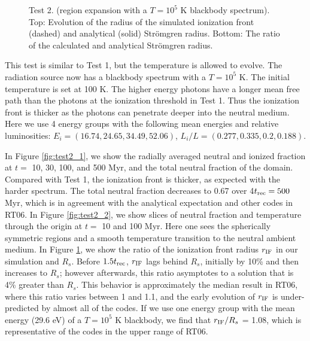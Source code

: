 \documentclass[useAMS,usenatbib]{mn2e}
\begin{document}
\begin{figure*}
  \caption{\label{fig:test2_2} Test 2. (\hii region expansion
    with a $T=10^5$ K blackbody spectrum).  Top: Slices through the
    origin of neutral fraction at 10 and 100 Myr.  Bottom: Slices of
    temperature at 10 and 100 Myr.}
\end{figure*}

\begin{figure}
  \caption{\label{fig:test2_3} Test 2. (\hii region expansion
    with a $T=10^5$ K blackbody spectrum).  Top: Evolution of the
    radius of the simulated ionization front (dashed) and analytical
    (solid) Str\"{o}mgren radius.  Bottom: The ratio of the calculated
    and analytical Str\"{o}mgren radius.}
\end{figure}

This test is similar to Test 1, but the temperature is allowed to
evolve.  The radiation source now has a blackbody spectrum with a $T =
10^5$ K.  The initial temperature is set at 100 K.  The higher energy
photons have a longer mean free path than the photons at the
ionization threshold in Test 1.  Thus the ionization front is thicker
as the photons can penetrate deeper into the neutral medium.  Here we
use 4 energy groups with the following mean energies and relative
luminosities: $E_i = (16.74, 24.65, 34.49, 52.06)$, $L_i/L = (0.277,
0.335, 0.2, 0.188)$.

In Figure \ref{fig:test2_1}, we show the radially averaged neutral and
ionized fraction at $t = $ 10, 30, 100, and 500 Myr, and the total
neutral fraction of the domain.  Compared with Test 1, the ionization
front is thicker, as expected with the harder spectrum.  The total
neutral fraction decreases to 0.67 over 4$t_{\rm rec} = 500$ Myr,
which is in agreement with the analytical expectation and other codes
in RT06.  In Figure \ref{fig:test2_2}, we show slices of neutral
fraction and temperature through the origin at $t = $ 10 and 100 Myr.
Here one sees the spherically symmetric \hii regions and a smooth
temperature transition to the neutral ambient medium.  In Figure
\ref{fig:test2_3}, we show the ratio of the ionization front radius
$r_{\rm IF}$ in our simulation and $R_s$.  Before $1.5t_{\rm rec}$,
$r_{\rm IF}$ lags behind $R_s$, initially by 10\% and then increases
to $R_s$; however afterwards, this ratio asymptotes to a solution that
is 4\% greater than $R_s$.  This behavior is approximately the median
result in RT06, where this ratio varies between 1 and 1.1, and the
early evolution of $r_{\rm IF}$ is under-predicted by almost all of
the codes.  If we use one energy group with the mean energy (29.6 eV)
of a $T=10^5$ K blackbody, we find that $r_{\rm IF}/R_s$ = 1.08, which
is representative of the codes in the upper range of RT06.
\end{document}

